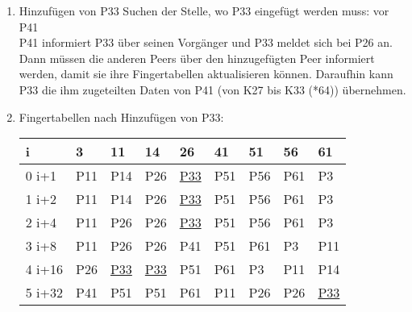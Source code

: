 \documentclass[a4paper]{article}
\begin{document}
\begin{enumerate}[label=\alph*)]
\item Hinzufügen von P33
Suchen der Stelle, wo P33 eingefügt werden muss: vor P41\\
P41 informiert P33 über seinen Vorgänger und P33 meldet sich bei P26 an. \\
 Dann müssen die anderen Peers über den hinzugefügten Peer informiert werden, damit sie ihre Fingertabellen aktualisieren können. Daraufhin kann P33 die ihm zugeteilten Daten von P41 (von K27 bis K33 (*64)) übernehmen.

\item Fingertabellen nach Hinzufügen von P33:\\
\begin{tabular}{| l | l | l | l | l | l | l | l | l |}
\hline 
i & 3 & 11 & 14 & 26 & 41 & 51 & 56 & 61\\
\hline
\hline
0 i+1 & P11 & P14 & P26 & \underline{P33} & P51 & P56 & P61 & P3\\
1 i+2 & P11 & P14 & P26 & \underline{P33} & P51 & P56 & P61 & P3\\
2 i+4 & P11 & P26 & P26 & \underline{P33} & P51 & P56 & P61 & P3\\
3 i+8 & P11 & P26 & P26 & P41 & P51 & P61 & P3 & P11\\
4 i+16 & P26 & \underline{P33} & \underline{P33} & P51 & P61 & P3 & P11 & P14\\
5 i+32 & P41 & P51 & P51 & P61 & P11 & P26 & P26 & \underline{P33}\\

\hline
\end{tabular}

\end{enumerate}
\end{document}
